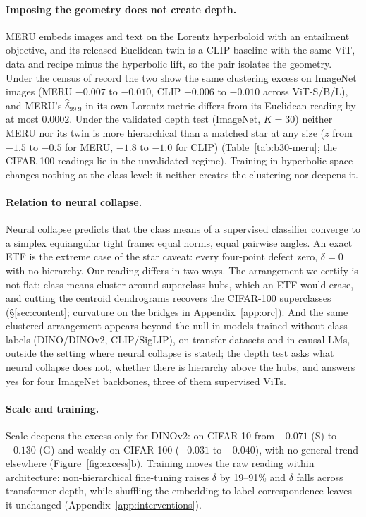 \paragraph{Imposing the geometry does not create depth.} MERU \citep{desai2023meru} embeds images and text on the Lorentz hyperboloid with an entailment objective, and its released Euclidean twin is a CLIP baseline with the same ViT, data and recipe minus the hyperbolic lift, so the pair isolates the geometry. Under the census of record the two show the same clustering excess on ImageNet images (MERU $-0.007$ to $-0.010$, CLIP $-0.006$ to $-0.010$ across ViT-S/B/L), and MERU's $\hat\delta_{99.9}$ in its own Lorentz metric differs from its Euclidean reading by at most $0.0002$. Under the validated depth test (ImageNet, $K{=}30$) neither MERU nor its twin is more hierarchical than a matched star at any size ($z$ from $-1.5$ to $-0.5$ for MERU, $-1.8$ to $-1.0$ for CLIP) (Table~\ref{tab:b30-meru}; the CIFAR-100 readings lie in the unvalidated regime). Training in hyperbolic space changes nothing at the class level: it neither creates the clustering nor deepens it. %

\paragraph{Relation to neural collapse.} Neural collapse \citep{papyan2020prevalence} predicts that the class means of a supervised classifier converge to a simplex equiangular tight frame: equal norms, equal pairwise angles. An exact ETF is the extreme case of the star caveat: every four-point defect zero, $\delta=0$ with no hierarchy. Our reading differs in two ways. The arrangement we certify is not flat: class means cluster around superclass hubs, which an ETF would erase, and cutting the centroid dendrograms recovers the CIFAR-100 superclasses (\S\ref{sec:content}; curvature on the bridges in Appendix~\ref{app:orc}). And the same clustered arrangement appears beyond the null in models trained without class labels (DINO/DINOv2, CLIP/SigLIP), on transfer datasets and in causal LMs, outside the setting where neural collapse is stated; the depth test asks what neural collapse does not, whether there is hierarchy above the hubs, and answers yes for four ImageNet backbones, three of them supervised ViTs. %

\paragraph{Scale and training.} Scale deepens the excess only for DINOv2: on CIFAR-10 from $-0.071$ (S) to $-0.130$ (G) and weakly on CIFAR-100 ($-0.031$ to $-0.040$), with no general trend elsewhere (Figure~\ref{fig:excess}b). Training moves the raw reading within architecture: non-hierarchical fine-tuning raises $\delta$ by 19--91\% and $\delta$ falls across transformer depth, while shuffling the embedding-to-label correspondence leaves it unchanged (Appendix~\ref{app:interventions}). %


